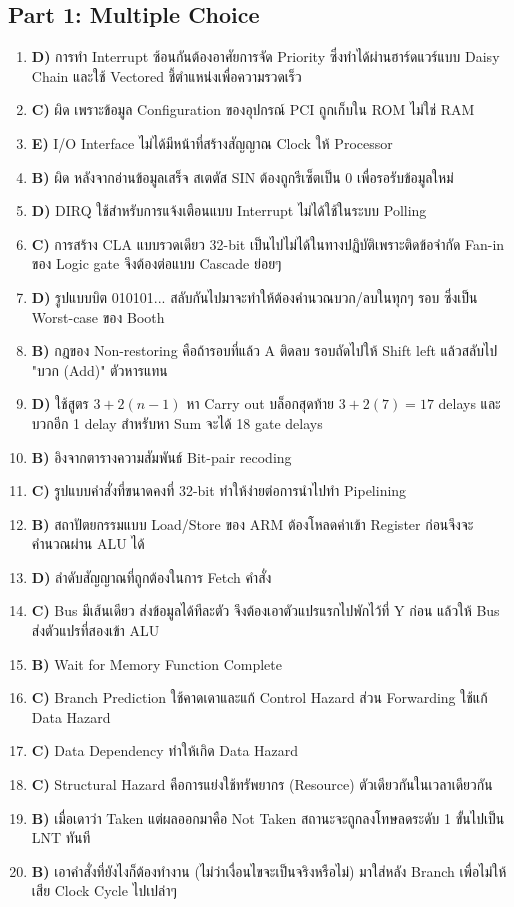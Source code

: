 \documentclass[12pt]{article}
\begin{document}
\subsection*{Part 1: Multiple Choice}
\begin{enumerate}
    \item \textbf{D)} การทำ Interrupt ซ้อนกันต้องอาศัยการจัด Priority ซึ่งทำได้ผ่านฮาร์ดแวร์แบบ Daisy Chain และใช้ Vectored ชี้ตำแหน่งเพื่อความรวดเร็ว
    \item \textbf{C)} ผิด เพราะข้อมูล Configuration ของอุปกรณ์ PCI ถูกเก็บใน ROM ไม่ใช่ RAM
    \item \textbf{E)} I/O Interface ไม่ได้มีหน้าที่สร้างสัญญาณ Clock ให้ Processor
    \item \textbf{B)} ผิด หลังจากอ่านข้อมูลเสร็จ สเตตัส SIN ต้องถูกรีเซ็ตเป็น 0 เพื่อรอรับข้อมูลใหม่
    \item \textbf{D)} DIRQ ใช้สำหรับการแจ้งเตือนแบบ Interrupt ไม่ได้ใช้ในระบบ Polling
    \item \textbf{C)} การสร้าง CLA แบบรวดเดียว 32-bit เป็นไปไม่ได้ในทางปฏิบัติเพราะติดข้อจำกัด Fan-in ของ Logic gate จึงต้องต่อแบบ Cascade ย่อยๆ
    \item \textbf{D)} รูปแบบบิต 010101... สลับกันไปมาจะทำให้ต้องคำนวณบวก/ลบในทุกๆ รอบ ซึ่งเป็น Worst-case ของ Booth
    \item \textbf{B)} กฎของ Non-restoring คือถ้ารอบที่แล้ว A ติดลบ รอบถัดไปให้ Shift left แล้วสลับไป "บวก (Add)" ตัวหารแทน
    \item \textbf{D)} ใช้สูตร $3 + 2(n-1)$ หา Carry out บล็อกสุดท้าย $3+2(7) = 17$ delays และบวกอีก 1 delay สำหรับหา Sum จะได้ 18 gate delays
    \item \textbf{B)} อิงจากตารางความสัมพันธ์ Bit-pair recoding
    \item \textbf{C)} รูปแบบคำสั่งที่ขนาดคงที่ 32-bit ทำให้ง่ายต่อการนำไปทำ Pipelining
    \item \textbf{B)} สถาปัตยกรรมแบบ Load/Store ของ ARM ต้องโหลดค่าเข้า Register ก่อนจึงจะคำนวณผ่าน ALU ได้
    \item \textbf{D)} ลำดับสัญญาณที่ถูกต้องในการ Fetch คำสั่ง
    \item \textbf{C)} Bus มีเส้นเดียว ส่งข้อมูลได้ทีละตัว จึงต้องเอาตัวแปรแรกไปพักไว้ที่ Y ก่อน แล้วให้ Bus ส่งตัวแปรที่สองเข้า ALU
    \item \textbf{B)} Wait for Memory Function Complete
    \item \textbf{C)} Branch Prediction ใช้คาดเดาและแก้ Control Hazard ส่วน Forwarding ใช้แก้ Data Hazard
    \item \textbf{C)} Data Dependency ทำให้เกิด Data Hazard
    \item \textbf{C)} Structural Hazard คือการแย่งใช้ทรัพยากร (Resource) ตัวเดียวกันในเวลาเดียวกัน
    \item \textbf{B)} เมื่อเดาว่า Taken แต่ผลออกมาคือ Not Taken สถานะจะถูกลงโทษลดระดับ 1 ขั้นไปเป็น LNT ทันที
    \item \textbf{B)} เอาคำสั่งที่ยังไงก็ต้องทำงาน (ไม่ว่าเงื่อนไขจะเป็นจริงหรือไม่) มาใส่หลัง Branch เพื่อไม่ให้เสีย Clock Cycle ไปเปล่าๆ
\end{enumerate}
\end{document}
